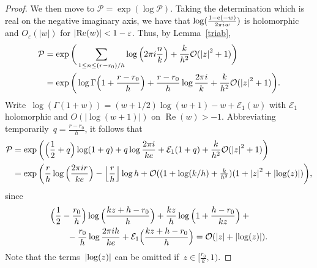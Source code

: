 \documentclass[11pt]{amsart}
\newcommand{\eps}{\varepsilon}
\newcommand{\E}{\mathcal{E}}
\theoremstyle{definition}
\newcommand{\pr}[1]{\mathchoice{\left( #1\right)}{(#1)}{(#1)}{(#1)}}
\newcommand{\e}[1][]{\ifthenelse{\equal{#1}{}}{{\rm e}}{\operatorname{e}\pr{ #1}}}
\newcommand{\Oh}{\mathcal{O}}
\renewcommand\Re{\operatorname{Re}}
\newcommand{\1}{{\mathbf 1}}
\newcommand{\abs}[1]{\left|#1\right|}
\let\originalleft\left
\let\originalright\right
\renewcommand{\left}{\mathopen{}\mathclose\bgroup\originalleft}
\renewcommand{\right}{\aftergroup\egroup\originalright}
\numberwithin{equation}{section}
\begin{document}
\begin{proof}
  We then move to $\mathcal{P}=\exp(\log \mathcal{P})$. Taking the determination which is real on the negative imaginary axis, we have that $\log(\frac{1-\e[-w]}{2\pi iw})$ is holomorphic and $O_\eps(|w|)$ for $\abs{\Re(w)}<1-\eps$.
Thus, by Lemma~\ref{triab},
  \begin{align*}
    \mathcal{P}&=\exp\bigg(\sum_{1\leq n \leq (r-r_0)/h} \log\Big(2\pi i\frac{n}{k}\Big)+\frac{k}{h^2}\Oh(\abs{z}^2+1)\bigg)\\
    &=\exp\bigg( \log\Gamma\Big(1+\frac{r-r_0}h\Big)+\frac{r-r_0}h\log\frac{2\pi i}k+\frac{k}{h^2}\Oh(\abs{z}^2+1)\bigg).
  \end{align*}
  Write~$\log (\Gamma(1+w))=(w+1/2)\log(w+1)-w+\E_1(w)$ with $\E_1$ holomorphic and $O(|\log (w+1)|)$ on $\Re(w)>-1$. Abbreviating temporarily~$q = \frac{r-r_0}h$, it follows that 
  \begin{align}
    \mathcal{P}&=\exp\bigg(
    \Big(\frac12+q\Big)\log(1+q)+ q\log\frac{2\pi i}{ke}
    +\E_1(1+q)+\frac{k}{h^2}\Oh(\abs{z}^2+1)
    \bigg)\notag\\
    &=\exp\bigg( {\frac rh}\log\Big(\frac{2\pi i  r}{ke}\Big)- \Big\lfloor \frac{r}h\Big\rfloor\log h+\Oh((1+\log(k/h)+\tfrac{k}{h^2})(1+\abs{z}^2+\abs{\log(z)})
    \bigg),\label{bfpp}
  \end{align}
  since
  \begin{align*}
    &\Big(\frac12-\frac{r_0}{h}\Big)\log\Big(\frac{kz+h-r_0}{h}\Big)+\frac{kz}h\log\Big(1+\frac{h-r_0}{kz}\Big)+{}\\
    &\qquad- \frac{r_0}h\log\frac{2\pi i h}{ke}+\E_1\Big(\frac{kz+h-r_0}h\Big) = \Oh(\abs{z} + \abs{\log(z)}).
  \end{align*}
  Note that the terms~$\abs{\log(z)}$ can be omitted if~$z\in[\frac{r_0}k, 1)$.


\end{proof}
\end{document}
